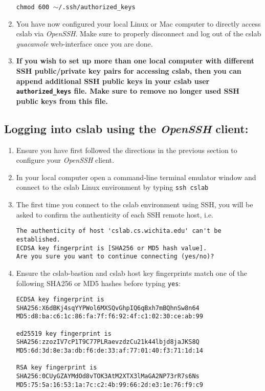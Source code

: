 \documentclass[12pt]{article}
\begin{document}
\begin{flushleft}
\begin{enumerate}
  \texttt{chmod 600 $\sim$/.ssh/authorized\_keys}
  \item You have now configured your local Linux or Mac computer to directly access cslab via \textit{OpenSSH}. Make sure to properly disconnect and log out of the cslab \textit{guacamole} web-interface once you are done.
  \item \textbf{If you wish to set up more than one local computer with different SSH public/private key pairs for accessing cslab, then you can append additional SSH public keys in your cslab user \texttt{authorized\_keys} file. Make sure to remove no longer used SSH public keys from this file.}
\end{enumerate}

\newpage
\subsection*{Logging into cslab using the \textit{OpenSSH} client:}
\begin{enumerate}
  \item Ensure you have first followed the directions in the previous section to configure your \textit{OpenSSH} client.
  \item In your local computer open a command-line terminal emulator window and connect to the cslab Linux environment by typing \break
  \texttt{ssh cslab}

  \item The first time you connect to the cslab environment using SSH, you will be asked to confirm the authenticity of each SSH remote host, i.e.
\begin{verbatim}
The authenticity of host 'cslab.cs.wichita.edu' can't be established.
ECDSA key fingerprint is [SHA256 or MD5 hash value].
Are you sure you want to continue connecting (yes/no)?
\end{verbatim}

  \item Ensure the cslab-bastion and cslab host key fingerprints match one of the following SHA256 or MD5 hashes before typing \texttt{yes}:
\begin{verbatim}
ECDSA key fingerprint is
SHA256:X6dBKj4sqYYPWol6MXSQvGhpIQ6qBxh7mBQhnSw8n64
MD5:d8:ba:c6:1c:86:fa:7f:f6:92:4f:c1:02:30:ce:ab:99

ed25519 key fingerprint is
SHA256:zzozIV7cP1T9C77PLRaevzdzCu21k44lbjd8jaJKS8Q
MD5:6d:3d:8e:3a:db:f6:de:33:af:77:01:40:f3:71:1d:14

RSA key fingerprint is
SHA256:0CUyGZAYMdOd8vTOK3AtM2XTX3lMaGA2NP73rR7s6Ns
MD5:75:5a:16:53:1a:7c:c2:4b:99:66:2d:e3:1e:76:f9:c9


\end{verbatim}
\end{enumerate}
\end{flushleft}
\end{document}

